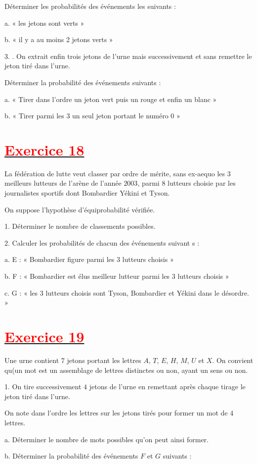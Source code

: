 \documentclass[12pt]{article}
\begin{document}
Déterminer les probabilités des événements les suivants :

a. « les jetons sont verts »

b. « il y a au moins 2 jetons verts »

3. . On extrait enfin trois jetons de l'urne mais successivement et sans remettre le jeton tiré dans l'urne. 

Déterminer la probabilité des événements suivants :

a. « Tirer dans l'ordre un jeton vert puis un rouge et enfin un blanc »

b. « Tirer parmi les $3$ un seul jeton portant le numéro $0$ »
\section*{\underline{\textbf{\textcolor{red}{Exercice 18}}}}
La fédération de lutte veut classer par ordre de mérite, sans ex-aequo les $3$ meilleurs lutteurs de l'arène de l'année $2003$, parmi $8$ lutteurs choisie par les journalistes sportifs dont Bombardier Yékini et Tyson.

On suppose l'hypothèse d'équiprobabilité vérifiée.

1. Déterminer le nombre de classements possibles.

2. Calculer les probabilités de chacun des événements suivant s :

a. E : « Bombardier figure parmi les $3$ lutteurs choisis »

b. F : « Bombardier est élus meilleur lutteur parmi les $3$ lutteurs choisis »

c. G : « les $3$ lutteurs choisis sont Tyson, Bombardier et Yékini dans le désordre. »
\section*{\underline{\textbf{\textcolor{red}{Exercice 19}}}}
Une urne contient $7$ jetons portant les lettres $A$, $T$, $E$, $H$, $M$, $U$ et $X.$
On convient qu(un mot est un assemblage de lettres distinctes ou non, ayant un sens ou non.

1. On tire successivement $4$ jetons de l'urne en remettant après chaque tirage le jeton tiré dans l'urne.

On note dans l'ordre les lettres sur les jetons tirés pour former un mot de $4$ lettres.

a. Déterminer le nombre de mots possibles qu'on peut ainsi former.

b. Déterminer la probabilité des événements $F$ et $G$ suivants :
\end{document}
